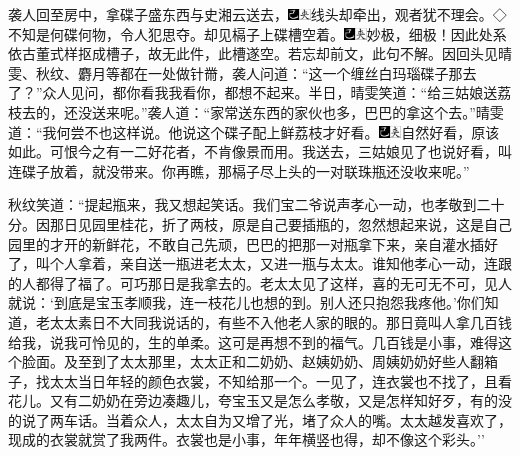 袭人回至房中，拿碟子盛东西与史湘云送去，{\includegraphics[width=3mm]{../Images/00003}\includegraphics[width=3mm]{../Images/00012}\footnotesize \kaishu 线头却牵出，观者犹不理会。◇不知是何碟何物，令人犯思夺。}却见槅子上碟槽空着。{\includegraphics[width=3mm]{../Images/00003}\includegraphics[width=3mm]{../Images/00012}\footnotesize \kaishu 妙极，细极！因此处系依古董式样抠成槽子，故无此件，此槽遂空。若忘却前文，此句不解。}因回头见晴雯、秋纹、麝月等都在一处做针黹，袭人问道：``这一个缠丝白玛瑙碟子那去了？''众人见问，都你看我我看你，都想不起来。半日，晴雯笑道：``给三姑娘送荔枝去的，还没送来呢。''袭人道：``家常送东西的家伙也多，巴巴的拿这个去。''晴雯道：``我何尝不也这样说。他说这个碟子配上鲜荔枝才好看。{\includegraphics[width=3mm]{../Images/00003}\includegraphics[width=3mm]{../Images/00012}\footnotesize \kaishu 自然好看，原该如此。可恨今之有一二好花者，不肯像景而用。}我送去，三姑娘见了也说好看，叫连碟子放着，就没带来。你再瞧，那槅子尽上头的一对联珠瓶还没收来呢。''

秋纹笑道：``提起瓶来，我又想起笑话。我们宝二爷说声孝心一动，也孝敬到二十分。因那日见园里桂花，折了两枝，原是自己要插瓶的，忽然想起来说，这是自己园里的才开的新鲜花，不敢自己先顽，巴巴的把那一对瓶拿下来，亲自灌水插好了，叫个人拿着，亲自送一瓶进老太太，又进一瓶与太太。谁知他孝心一动，连跟的人都得了福了。可巧那日是我拿去的。老太太见了这样，喜的无可无不可，见人就说：`到底是宝玉孝顺我，连一枝花儿也想的到。别人还只抱怨我疼他。'你们知道，老太太素日不大同我说话的，有些不入他老人家的眼的。那日竟叫人拿几百钱给我，说我可怜见的，生的单柔。这可是再想不到的福气。几百钱是小事，难得这个脸面。及至到了太太那里，太太正和二奶奶、赵姨奶奶、周姨奶奶好些人翻箱子，找太太当日年轻的颜色衣裳，不知给那一个。一见了，连衣裳也不找了，且看花儿。又有二奶奶在旁边凑趣儿，夸宝玉又是怎么孝敬，又是怎样知好歹，有的没的说了两车话。当着众人，太太自为又增了光，堵了众人的嘴。太太越发喜欢了，现成的衣裳就赏了我两件。衣裳也是小事，年年横竖也得，却不像这个彩头。''

